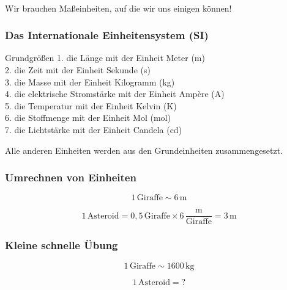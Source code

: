 \documentclass{beamer}
\begin{document}
\begin{frame}
\begin{columns}
\begin{column}{5cm}
\end{column}
 


\end{columns}


$\,$\\[0.5 cm]
Wir brauchen Maßeinheiten, auf die wir uns einigen können! 

\end{frame}



\begin{frame}

\frametitle{Das Internationale Einheitensystem (SI)}


\begin{block}{Grundgrößen}
1. die Länge mit der Einheit Meter (m) \\
2. die Zeit mit der Einheit Sekunde (s) \\
3. die Masse mit der Einheit Kilogramm (kg) \\
4. die elektrische Stromstärke mit der Einheit Ampère (A) \\
5. die Temperatur mit der Einheit Kelvin (K) \\
6. die Stoffmenge mit der Einheit Mol (mol) \\
7. die Lichtstärke mit der Einheit Candela (cd) \\
\end{block}

\pause

Alle anderen Einheiten werden aus den Grundeinheiten zusammengesetzt. 

\end{frame}


\begin{frame}
\frametitle{Umrechnen von Einheiten}

\[1\, \text{Giraffe} \sim 6\,\text{m} \]

\[
1\,\text{Asteroid} = 0,5\, \text{Giraffe} \times 6\, \frac{\text{m}}{\text{Giraffe}} = 3\,\text{m}
\]


\end{frame}


\begin{frame}
\frametitle{Kleine schnelle Übung}

\[1\, \text{Giraffe} \sim 1600\,\text{kg} \]

\[
1\,\text{Asteroid} =  ?
\]


\end{frame}
\end{document}
